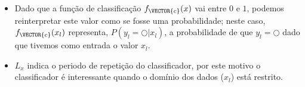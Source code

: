 \begin{tcbattention}
\begin{itemize}
\item Dado que a função de classificação $f_{\VECTOR{c}}(x)$ vai entre $0$ e $1$,
podemos reinterpretar este valor como se fosse uma probabilidade;
neste caso, $f_{\VECTOR{c}}(x_l)$ representa, $P(y_l=\bigcirc|x_l)$, 
a probabilidade de que $y_l=\bigcirc$ dado que tivemos como entrada o valor $x_l$.
\item $L_x$ indica o periodo de repetição do classificador,
por este motivo o classificador é interessante quando o domínio dos dados ($x_l$) está restrito.
\end{itemize}
\end{tcbattention}

